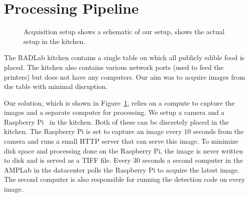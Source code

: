 \section{Processing Pipeline}
\begin{figure}[!h]
\begin{center}
\hfill
{}
\caption[]{Acquisition setup  shows a schematic of our setup,  shows the actual setup in
the kitchen.}
\label{fig:acquisition}
\end{center}
\end{figure}
The RADLab kitchen contains a single table on which all publicly edible food is placed. The kitchen also contains
various network ports (used to feed the printers) but does not have any computers. Our aim was to acquire images from
the table with minimal disruption. 

Our solution, which is shown in Figure~\ref{fig:acquisition}, relies on a compute to capture the images and a separate
computer for processing. We setup a camera and a Raspberry Pi~\cite{rpi} in the kitchen. Both of these can be discretely
placed in the kitchen. The Raspberry Pi is set to capture an image every $10$ seconds from the camera and runs a small
HTTP server that can serve this image. To minimize disk space and processing done on the Raspberry Pi, the image is
never written to disk and is served as a TIFF file. Every $30$ seconds a second computer in the AMPLab in the datacenter
polls the Raspberry Pi to acquire the latest image. The second computer is also responsible for running the detection
code on every image.


